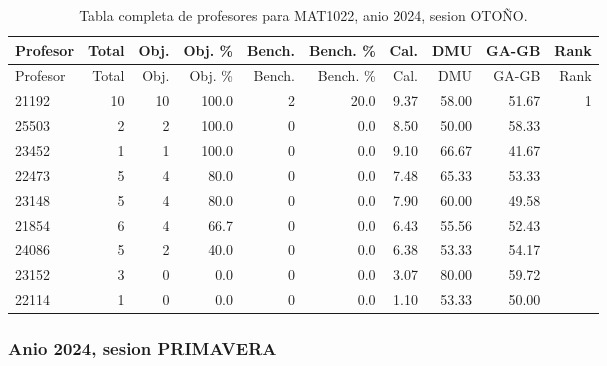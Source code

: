 \begingroup
\scriptsize
\setlength{\tabcolsep}{3pt}
\begin{longtable}{lrrrrrrrrr}
\caption{Tabla completa de profesores para MAT1022, anio 2024, sesion OTOÑO.}\label{tab:prof-period-mat1022-2024-oto-o-especializado}\\
\toprule
Profesor & Total & Obj. & Obj. \% & Bench. & Bench. \% & Cal. & DMU & GA-GB & Rank \\
\midrule
\endfirsthead
\toprule
Profesor & Total & Obj. & Obj. \% & Bench. & Bench. \% & Cal. & DMU & GA-GB & Rank \\
\midrule
\endhead
21192 & 10 & 10 & 100.0 & 2 & 20.0 & 9.37 & 58.00 & 51.67 & 1 \\
25503 & 2 & 2 & 100.0 & 0 & 0.0 & 8.50 & 50.00 & 58.33 &  \\
23452 & 1 & 1 & 100.0 & 0 & 0.0 & 9.10 & 66.67 & 41.67 &  \\
22473 & 5 & 4 & 80.0 & 0 & 0.0 & 7.48 & 65.33 & 53.33 &  \\
23148 & 5 & 4 & 80.0 & 0 & 0.0 & 7.90 & 60.00 & 49.58 &  \\
21854 & 6 & 4 & 66.7 & 0 & 0.0 & 6.43 & 55.56 & 52.43 &  \\
24086 & 5 & 2 & 40.0 & 0 & 0.0 & 6.38 & 53.33 & 54.17 &  \\
23152 & 3 & 0 & 0.0 & 0 & 0.0 & 3.07 & 80.00 & 59.72 &  \\
22114 & 1 & 0 & 0.0 & 0 & 0.0 & 1.10 & 53.33 & 50.00 &  \\
\bottomrule
\end{longtable}
\endgroup

\subsubsection{Anio 2024, sesion PRIMAVERA}

